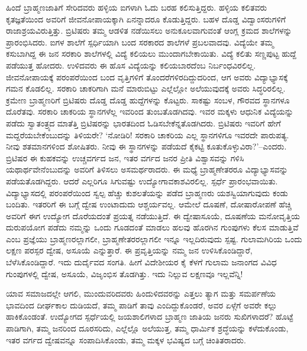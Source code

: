 ಹಿಂದೆ ಬ್ರಾಹ್ಮಣಜಾತಿಗೆ ಸೇರಿದವರು ಹಳ್ಳಿಯ ಐಗಳಾಗಿ ಓದು ಬರಹ ಕಲಿಸುತ್ತಿದ್ದರು. ಹಳ್ಳಿಯ ಕಲಿತವರು ಕೃತಜ್ಞತೆಯಿಂದ ಅವರಿಗೆ ಜೀವನೋಪಾಯಕ್ಕಾಗಿ ಏನನ್ನಾದರೂ ಕೊಡು\-ತ್ತಿದ್ದರು. ಬಹಳ ದೊಡ್ಡ ವಿದ್ವಾಂಸರುಗಳಿಗೆ ರಾಜಾಶ್ರಯವಿರುತ್ತಿತ್ತು. ಬ್ರಿಟಿಷರು ತಮ್ಮ ಆಡಳಿತ ನಡೆಯಿಸಲು ಅನುಕೂಲವಾಗುವಂತೆ ಆಂಗ್ಲ ಕ್ರಮದ ಶಾಲೆಗಳನ್ನು ಪ್ರಾರಂಭಿಸಿದರು. ಐಗಳ ಶಾಲೆಗೆ ಸ್ಪರ್ಧಿಯಾಗಿ ಬಂದ ಸರಕಾರದ ಶಾಲೆಗಳೆ ಪ್ರಬಲವಾದವು. ವಿದ್ಯೆಯೇ ತಮ್ಮ ಕಸುಬಾಗಿದ್ದ ಈ ಜನ ಸರಕಾರಿ ಶಾಲೆಗಳಲ್ಲಿ ವಿದ್ಯೆ ಕಲಿಯಲು ಮುಂದಾಗಬೇಕಾಯಿತು. ವಿದ್ಯೆ ಕಲಿತು ಸಣ್ಣಪುಟ್ಟ ಹುದ್ದೆ ಪಡೆಯುತ್ತ ಹೋದರು. ಉಳಿದವರು ಈ ಹೊಸ ವಿದ್ಯೆಯನ್ನು ಕಲಿಯಬಾರದೆಂಬ ನಿರ್ಬಂಧವಿರಲಿಲ್ಲ. ಜೀವನೋಪಾಯಕ್ಕೆ ಪರಂಪರೆಯಿಂದ ಬಂದ ವೃತ್ತಿಗಳಿಗೆ ತೊಂದರೆಗಳಿರ\-ದಿದ್ದುದ\-ರಿಂದ, ಆಗ ಅವರು ವಿದ್ಯಾಭ್ಯಾಸಕ್ಕೆ ಗಮನ ಕೊಡಲಿಲ್ಲ. ಸರಕಾರಿ ಚಾಕರಿಗಾಗಿ ಮನೆ ಮಾರುಬಿಟ್ಟು ಎಲ್ಲೆಲ್ಲೋ ಅಲೆಯುವುದಕ್ಕೆ ಅವರು ಸಿದ್ಧರಿರಲಿಲ್ಲ. ಕ್ರಮೇಣ ಬ್ರಾಹ್ಮಣರಿಗೆ ಬ್ರಿಟಿಷರು ದೊಡ್ಡ ದೊಡ್ಡ ಹುದ್ದೆಗಳನ್ನು ಕೊಟ್ಟರು. ಸಾಕಷ್ಟು ಸಂಬಳ, ಗೌರವದ ಸ್ಥಾನಗಳೂ ದೊರೆತವು. ಸರಕಾರಿ ಚಾಕರಿಯ ಸ್ಥಾನಗಳೆಲ್ಲ ಇವರಿಂದ ತುಂಬತೊಡಗಿದವು. ಇವರ ಮಕ್ಕಳು ಆಧುನಿಕ ವಿದ್ಯೆಯನ್ನು ಪಡೆದು ಸ್ವಾತಂತ್ರ್ಯದ ಮಾತೆತ್ತಿ ಬ್ರಿಟಿಷರನ್ನು ಭಾರತದಿಂದ ಓಡಿಸಬೇಕೆನ್ನತೊಡಗಿದರು. ಬ್ರಿಟಿಷರು ಇವರಿಗೆ ಹೇಗೆ ಮದ್ದರೆಯಬೇಕೆಂಬುದನ್ನು ತಿಳಿಯರೇ? ‘ನೋಡಿರಿ! ಸರಕಾರಿ ಚಾಕರಿಯ ಎಲ್ಲ ಸ್ಥಾನಗಳಿಗೂ ಇವರದೇ ಪಾರುಪತ್ಯ. ನೀವು ಶತಮಾನಗಳಿಂದ ಶೋಷಿತರು. ನೀವು ಈ ಸ್ಥಾನಗಳನ್ನು ಪಡೆಯದೆ ಕೈಕಟ್ಟಿ ಕೂತುಕೊಳ್ಳುವಿರಾ?’–ಎಂದರು. ಬ್ರಿಟಿಷರ ಈ ಕುಹಕವನ್ನು ಉಚ್ಚವರ್ಗದ ಜನ, ಇತರ ವರ್ಗದ ಜನರ ಪ್ರೀತಿ ವಿಶ್ವಾಸವನ್ನು ಗಳಿಸಿ ಯಥಾರ್ಥವೇನೆಂಬುದನ್ನು ಅವರಿಗೆ ತಿಳಿಸಲು ಅಸಮರ್ಥರಾದರು. ಈ ಮಧ್ಯೆ ಬ್ರಾಹ್ಮಣೇತರರೂ ವಿದ್ಯಾಭ್ಯಾಸವನ್ನು ಪಡೆಯತೊಡಗಿದ್ದರು. ಆದರೆ ಎಲ್ಲರಿಗೂ ಸಿಗುವಷ್ಟು ಉದ್ಯೋಗಾವಕಾಶವಿರಲಿಲ್ಲ. ಸ್ಪರ್ಧೆ ಪ್ರಾರಂಭವಾಯಿತು. ವಿದ್ಯಾಭ್ಯಾಸದಲ್ಲಿ ಪರಂಪರೆಯಿಂದ ಸ್ವಲ್ಪ ಹೆಚ್ಚು ಕುಶಲತೆಯನ್ನು ಪಡೆದ ಬ್ರಾಹ್ಮಣರು ಯಶಸ್ವಿಯಾಗುವುದು ಕಂಡು ಬಂದಿತು. ಇತರರಿಗೆ ಈ ಬಗ್ಗೆ ದ್ವೇಷ ಉಂಟಾದುದು ಆಶ್ಚರ್ಯವಲ್ಲ. ಆಮೇಲೆ ದೂಷಣೆ, ದೋಷಾ\-ರೋಪಣೆ ಹೆಚ್ಚಿ ಅವರಿಗೆ ಈಗ ಉದ್ಯೋಗ ದೊರೆಯದಂತೆ ಪ್ರಯತ್ನ ನಡೆಯುತ್ತಿದೆ. ಈ ದ್ವೇಷಾಸೂಯೆ, ದೂಷಣೆಯ ಮನೋವೃತ್ತಿಯ ದುರುಪಯೋಗ ಪಡೆದು ನಮ್ಮನ್ನು ಒಂದು ಗೂಡದಂತೆ ಮಾಡಲು ಹಲವು ಹೊರಗಿನ ಗುಂಪುಗಳು ಕೆಲಸ ಮಾಡುತ್ತಿವೆ ಎಂಬ ಪ್ರಜ್ಞೆಯು ಬ್ರಾಹ್ಮಣರಲ್ಲಾಗಲೀ, ಬ್ರಾಹ್ಮಣೇತರರಲ್ಲಾಗಲೀ ಇನ್ನೂ ಇಲ್ಲದಿರುವುದು ಸ್ಪಷ್ಟ. ಗುಲಾಮಗಿರಿಯ ಒಂದು ಲಕ್ಷಣ ಪರಸ್ಪರ ದ್ವೇಷ, ಅಸೂಯೆ ಎನ್ನುತ್ತಾರೆ. ಈ ಪ್ರವೃತ್ತಿಯನ್ನು ನಮ್ಮ ಜನ ಉಳಿಸಿಕೊಂಡಿದ್ದಾರೆ, ಬೆಳೆಸಿಕೊಂಡಿದ್ದಾರೆ. ಇದು ದುರ್ದೈವದ ಸಂಗತಿ. ಹೀಗೆ ವಿದೇಶೀಯರ ಕೈ ಕೆಳಗೆ ಗುಲಾಮ ಜನಾಂಗದ ವಿವಿಧ ಗುಂಪುಗಳಲ್ಲಿ ದ್ವೇಷ, ಅಸೂಯೆ, ವಿಜೃಂಭಿಸ ತೊಡಗಿತ್ತು. ಇದು ನಿಲ್ಲುವ ಲಕ್ಷಣವೂ ಇಲ್ಲವೆನ್ನಿ!

ಯಾವ ಸಮಾಜದಲ್ಲೇ ಆಗಲಿ, ಮುಂದುವರಿದವರು ಹಿಂದುಳಿದವರನ್ನು ಎತ್ತಲು ತ್ಯಾಗ ಮತ್ತು ಸಮರ್ಪಣೆಯ ಭಾವದಿಂದ ದೀರ್ಘಕಾಲ ದುಡಿಯದೆ, ತಮ್ಮ ಪಾಡಿಗೆ ತಾವು ಎಂದಿದ್ದು\-ಕೊಂಡರೆ, ಅವರ ಏಳ್ಗೆಗೆ ಅವರೇ ಕಲ್ಲು ಹಾಕಿಕೊಂಡಂತೆ. ಉದ್ಯೋಗದ ಸ್ಪರ್ಧೆಯಲ್ಲಿ ಜಯಶಾಲಿ\-ಗಳಾದ ಬ್ರಾಹ್ಮಣ ಜಾತಿಯ ಜನರು ಸುಖಿಗಳಾದರೆ? ಹೊಟ್ಟೆ ಪಾಡಿಗಾಗಿ, ತಮ್ಮ ಜನರಿಂದ ದೂರಸರಿದು, ಎಲ್ಲೆಲ್ಲೊ ಅಲೆಯುತ್ತ, ತಮ್ಮ ಧಾರ್ಮಿಕ ಶ್ರದ್ಧೆಯನ್ನು ಕಳೆದುಕೊಂಡು, ಇತರ ವರ್ಗದ ದ್ವೇಷವನ್ನೂ ಸಂಪಾದಿಸಿಕೊಂಡು, ತಮ್ಮ ಮಕ್ಕಳ ಭವಿಷ್ಯದ ಬಗ್ಗೆ ಚಿಂತಿತರಾದರು.

